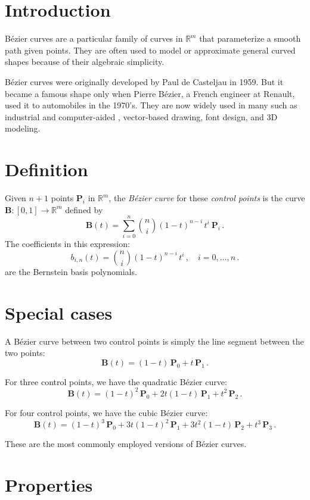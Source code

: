 \documentclass[12pt]{article}
\begin{document}
\section{Introduction}
B\'ezier curves are a particular family of curves in $\mathbb{R}^m$
that parameterize a smooth path  given points.
They are often used to model or approximate general curved shapes 
because of their algebraic simplicity.

B\'ezier curves were originally developed by Paul de Casteljau in 1959. But it became a famous shape only when Pierre B\'ezier, a French engineer at Renault, used it to  automobiles in the 1970's. 
They are now widely used in many  such as industrial and computer-aided , 
vector-based drawing, font design, and 3D modeling.

\section{Definition}
Given $n+1$ points $\boldsymbol{P}_i$ in $\mathbb{R}^m$,
the \emph{B\'ezier curve} for these \emph{control points} is the curve $\boldsymbol{B} \colon [0,1] \to \mathbb{R}^m$
defined by
\[
\boldsymbol{B}(t) = \sum_{i=0}^{n} \binom{n}{i} (1-t)^{n-i} \, t^i \: \boldsymbol{P}_i\,.
\]
The coefficients in this expression:
\[
b_{i,n}(t) = \binom{n}{i} (1-t)^{n-i} \, t^i \,, \quad  i=0,\ldots, n\,.
\]
are the Bernstein basis polynomials.

\section{Special cases}
A B\'ezier curve between two control points is simply the line segment
between the two points:
\[
\boldsymbol{B}(t) = (1-t) \, \boldsymbol{P}_0  +  t \, \boldsymbol{P}_1\,.
\]

For three control points, we have the quadratic B\'ezier curve:
\[
\boldsymbol{B}(t) = (1-t)^2 \, \boldsymbol{P}_0  +  2 t (1-t) \, \boldsymbol{P}_1 +  t^2 \, \boldsymbol{P}_2\,.
\]

For four control points, we have the cubic B\'ezier curve:
\[
\boldsymbol{B}(t) =  (1-t)^3 \, \boldsymbol{P}_0 +  3 t (1-t)^2 \, \boldsymbol{P}_1 + 3 t^2 (1-t) \, \boldsymbol{P}_2 + t^3\,  \boldsymbol{P}_3\,.
\]

These are the most commonly employed versions of B\'ezier curves.


\section{Properties}
\end{document}
